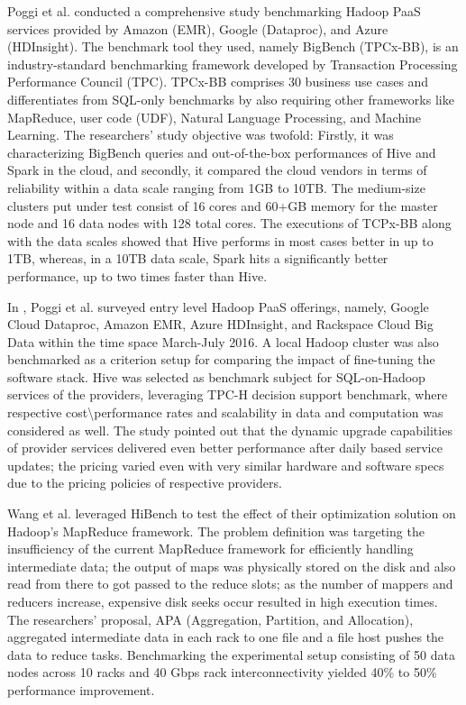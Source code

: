 \documentclass[review]{elsarticle}
\begin{document}
Poggi et al. \cite{poggi_characterizing_2018} conducted a comprehensive study benchmarking Hadoop PaaS services provided by Amazon (EMR), Google (Dataproc), and Azure (HDInsight). The benchmark tool they used, namely BigBench (TPCx-BB), is an industry-standard benchmarking framework developed by Transaction Processing Performance Council (TPC). TPCx-BB comprises 30 business use cases and differentiates from SQL-only benchmarks by also requiring other frameworks like MapReduce, user code (UDF), Natural Language Processing, and Machine Learning. The researchers' study objective was twofold: Firstly, it was characterizing BigBench queries and out-of-the-box performances of Hive and Spark in the cloud, and secondly, it compared the cloud vendors in terms of reliability within a data scale ranging from 1GB to 10TB. The medium-size clusters put under test consist of 16 cores and 60+GB memory for the master node and 16 data nodes with 128 total cores. The executions of TCPx-BB along with the data scales showed that Hive performs in most cases better in up to 1TB, whereas, in a 10TB data scale, Spark hits a significantly better performance, up to two times faster than Hive.

In \cite{poggi_state_2016}, Poggi et al. surveyed entry level Hadoop PaaS offerings, namely, Google Cloud Dataproc, Amazon EMR, Azure HDInsight, and Rackspace Cloud Big Data within the time space March-July 2016. A local Hadoop cluster was also benchmarked as a criterion setup for comparing the impact of fine-tuning the software stack. Hive was selected as benchmark subject for SQL-on-Hadoop services of the providers, leveraging TPC-H decision support benchmark, where respective cost\textbackslash{}performance rates and scalability in data and computation was considered as well. The study pointed out that the dynamic upgrade capabilities of provider services delivered even better performance after daily based service updates; the pricing varied even with very similar hardware and software specs due to the pricing policies of respective providers.

Wang et al. \cite{wang_improved_2020} leveraged HiBench to test the effect of their optimization solution on Hadoop's MapReduce framework. The problem definition was targeting the insufficiency of the current MapReduce framework for efficiently handling intermediate data; the output of maps was physically stored on the disk and also read from there to got passed to the reduce slots; as the number of mappers and reducers increase, expensive disk seeks occur resulted in high execution times. The researchers' proposal, APA (Aggregation, Partition, and Allocation), aggregated intermediate data in each rack to one file and a file host pushes the data to reduce tasks. Benchmarking the experimental setup consisting of 50 data nodes across 10 racks and 40 Gbps rack interconnectivity yielded 40\% to 50\% performance improvement. 
\end{document}

